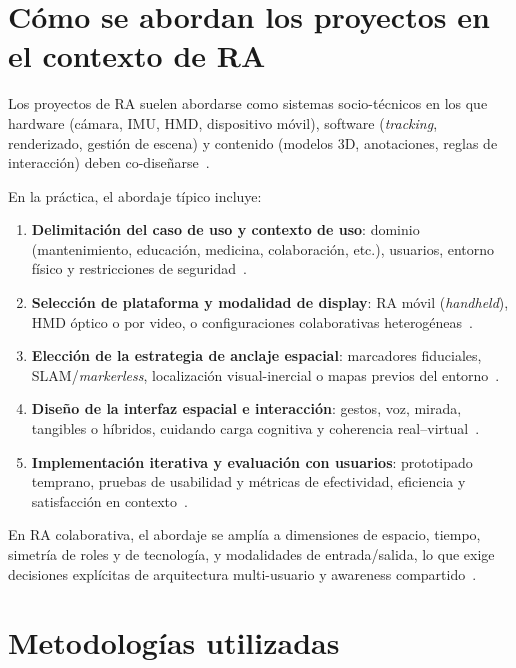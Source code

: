 \documentclass[conference]{IEEEtran}
\begin{document}
\section{C\'omo se abordan los proyectos en el contexto de RA}

Los proyectos de RA suelen abordarse como sistemas socio-t\'ecnicos en los que hardware (c\'amara, IMU, HMD, dispositivo m\'ovil), software (\emph{tracking}, renderizado, gesti\'on de escena) y contenido (modelos 3D, anotaciones, reglas de interacci\'on) deben co-dise\~narse~\cite{schmalstieg2016principles,devagiri2024essentials}.

En la pr\'actica, el abordaje t\'ipico incluye:
\begin{enumerate}
\item \textbf{Delimitaci\'on del caso de uso y contexto de uso}: dominio (mantenimiento, educaci\'on, medicina, colaboraci\'on, etc.), usuarios, entorno f\'isico y restricciones de seguridad~\cite{nist2022ar,sereno2022collaborative}.
\item \textbf{Selecci\'on de plataforma y modalidad de display}: RA m\'ovil (\emph{handheld}), HMD \'optico o por video, o configuraciones colaborativas heterog\'eneas~\cite{syed2023indepth,devagiri2024essentials}.
\item \textbf{Elecci\'on de la estrategia de anclaje espacial}: marcadores fiduciales, SLAM/\emph{markerless}, localizaci\'on visual-inercial o mapas previos del entorno~\cite{kim2018revisiting,syed2023indepth}.
\item \textbf{Dise\~no de la interfaz espacial e interacci\'on}: gestos, voz, mirada, tangibles o h\'ibridos, cuidando carga cognitiva y coherencia real--virtual~\cite{kourouthanassis2015demystifying,endsley2017heuristics}.
\item \textbf{Implementaci\'on iterativa y evaluaci\'on con usuarios}: prototipado temprano, pruebas de usabilidad y m\'etricas de efectividad, eficiencia y satisfacci\'on en contexto~\cite{nist2022ar,dunser2011evaluating}.
\end{enumerate}

En RA colaborativa, el abordaje se ampl\'ia a dimensiones de espacio, tiempo, simetr\'ia de roles y de tecnolog\'ia, y modalidades de entrada/salida, lo que exige decisiones expl\'icitas de arquitectura multi-usuario y awareness compartido~\cite{billinghurst2002collaborative,sereno2022collaborative}.

\section{Metodolog\'ias utilizadas}
\end{document}
